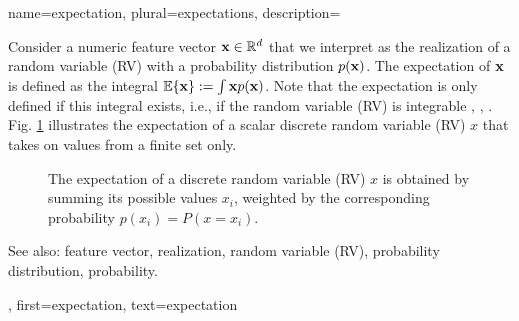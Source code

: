 {
{name={expectation}, plural={expectations},
  description={Consider a numeric feature vector ${\bf x} \in \mathbb{R}^{d}$ 
	that we interpret as the realization of a random variable (RV) with a probability distribution $p({\bf x})$. 
	The expectation of ${\bf x}$ is defined as the integral $\mathbb{E}  \{ {\bf x} \} := \int {\bf x} p({\bf x})$. 
	Note that the expectation is only defined if this integral exists, i.e., if the random variable (RV) is integrable 
	\cite{RudinBookPrinciplesMatheAnalysis}, \cite{BillingsleyProbMeasure}, \cite{HalmosMeasure}. 
	Fig. \ref{fig_expect_discrete_dict} illustrates the expectation of a scalar discrete random variable (RV) $x$ that takes on values 
	from a finite set only. 
   \begin{figure}[H]
   	\begin{center}
\end{center}
\vspace*{-5mm}
\caption{The expectation of a discrete random variable (RV) $x$ is obtained by summing its possible values $x_{i}$, weighted 
	by the corresponding probability $p(x_i) = P\left(x= x_i\right)$. \label{fig_expect_discrete_dict}}
 \end{figure}
		See also: feature vector, realization, random variable (RV), probability distribution, probability.},
first={expectation},
text={expectation}
}

}
